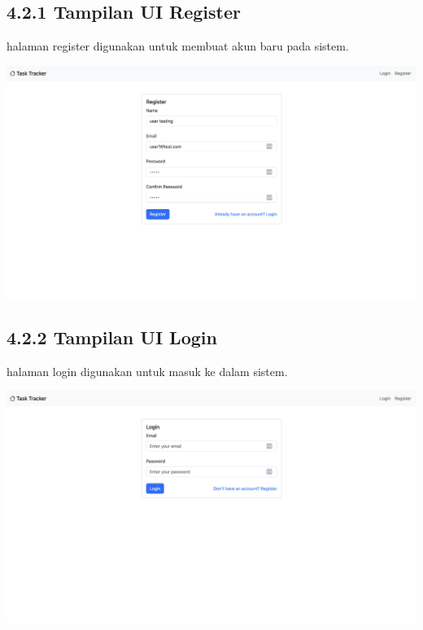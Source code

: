\subsection*{4.2.1 Tampilan UI Register}
halaman register digunakan untuk membuat akun baru pada sistem.
\begin{center}
  \includegraphics[width=1\textwidth]{assets/ui/register_filled.png}
\end{center}


\subsection*{4.2.2 Tampilan UI Login}
halaman login digunakan untuk masuk ke dalam sistem.
\begin{center}
  \includegraphics[width=1\textwidth]{assets/ui/login.png}
\end{center}

